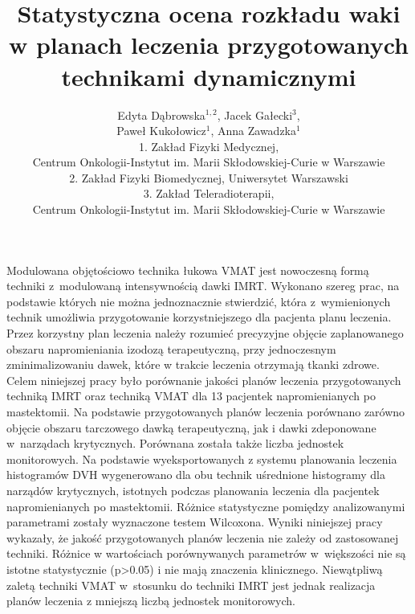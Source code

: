 \documentclass[12pt, a4paper]{article}
\begin{document}
\title{Statystyczna ocena rozkładu waki w planach leczenia przygotowanych technikami dynamicznymi}
\author{Edyta Dąbrowska$^{1,2}$, Jacek Gałecki$^3$, \\Paweł Kukołowicz$^1$, Anna Zawadzka$^1$ \\ 1. Zakład Fizyki Medycznej, \\Centrum Onkologii-Instytut im. Marii Skłodowskiej-Curie w Warszawie \\2. Zakład Fizyki Biomedycznej, Uniwersytet Warszawski \\3. Zakład Teleradioterapii, \\Centrum Onkologii-Instytut im. Marii Skłodowskiej-Curie w Warszawie}
\date {}
\maketitle
\thispagestyle{title}
Modulowana objętościowo technika łukowa VMAT jest nowoczesną formą techniki z modulowaną intensywnością dawki IMRT. Wykonano szereg prac, na podstawie których nie można jednoznacznie stwierdzić, która z wymienionych technik umożliwia przygotowanie korzystniejszego dla pacjenta planu leczenia. Przez korzystny plan leczenia należy rozumieć precyzyjne objęcie zaplanowanego obszaru napromieniania izodozą terapeutyczną, przy jednoczesnym zminimalizowaniu dawek, które w trakcie leczenia otrzymają tkanki zdrowe. 
	Celem niniejszej pracy było porównanie jakości planów leczenia przygotowanych techniką IMRT oraz techniką VMAT dla 13 pacjentek napromienianych po mastektomii. Na podstawie przygotowanych planów leczenia porównano zarówno objęcie obszaru tarczowego dawką terapeutyczną, jak i dawki zdeponowane w narządach krytycznych. Porównana została także liczba jednostek monitorowych. Na podstawie wyeksportowanych z systemu planowania leczenia histogramów DVH wygenerowano dla obu technik uśrednione histogramy dla narządów krytycznych, istotnych podczas planowania leczenia dla pacjentek napromienianych po mastektomii. Różnice statystyczne pomiędzy analizowanymi parametrami zostały wyznaczone testem Wilcoxona.
	Wyniki niniejszej pracy wykazały, że jakość przygotowanych planów leczenia nie zależy od zastosowanej techniki. Różnice w wartościach porównywanych parametrów w większości nie są istotne statystycznie (p>0.05) i nie mają znaczenia klinicznego. Niewątpliwą zaletą techniki VMAT w stosunku do techniki IMRT jest jednak realizacja planów leczenia z mniejszą liczbą jednostek monitorowych.
\end{document}
